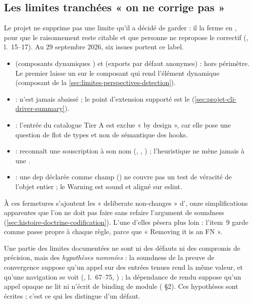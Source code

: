\subsection{Les limites tranchées « on ne corrige pas »}

Le projet ne supprime pas une limite qu'il a décidé de garder : il la ferme en , pour que le raisonnement reste citable et que personne ne repropose le correctif (, l.~15--17). Au 29 septembre 2026, six issues portent ce label.
\begin{itemize}
\item {} (composants dynamiques ) et  (exports par défaut anonymes) : hors périmètre. Le premier laisse un  sur le composant qui rend l'élément dynamique (composant  de la \cref{sec:limites-perspectives-detection}).
\item {} :  n'est jamais abaissé ; le point d'extension supporté est le  (\cref{sec:projet-cli-driver-summary}).
\item {} : l'entrée  du catalogue Tier A est exclue « by design », car elle pose une question de flot de types et non de sémantique des hooks.
\item {} :  reconnaît une souscription à son nom (, , ) ; l'heuristique ne mène jamais à une \Error{}.
\item {} : une dep déclarée comme champ (\code{[x?.locale]}) ne couvre pas un test de véracité de l'objet entier ; le Warning est sound et aligné sur eslint.
\end{itemize}
À ces fermetures s'ajoutent les « deliberate non-changes » d', onze simplifications apparentes que l'on ne doit pas faire sans refaire l'argument de soundness (\cref{sec:histoire-doctrine-codification}). L'une d'elles pèsera plus loin : l'item~9 garde  comme passe propre à chaque règle, parce que « Removing it is an FN ».

\begin{remarque}
Une partie des limites documentées ne sont ni des défauts ni des compromis de précision, mais des \emph{hypothèses nommées} : la soundness de la preuve de convergence suppose qu'un appel sur des entrées tenues rend la même valeur, et qu'une navigation se voit (, l.~67--75, ) ; la dépendance de rendu suppose qu'un appel opaque ne lit ni n'écrit de binding de module ( §2). Ces hypothèses sont écrites ; c'est ce qui les distingue d'un défaut.
\end{remarque}

